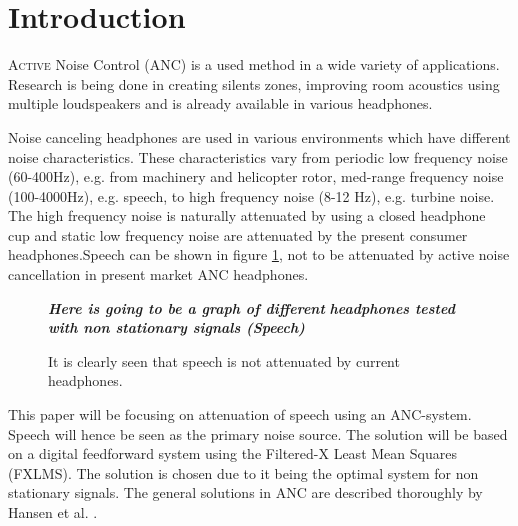 \section{Introduction}
\lettrine[lines=2]{A}{ctive} Noise Control (ANC) is a used method in a wide variety of applications. Research is being done in creating silents zones\cite{SilentZones}, improving room acoustics using multiple loudspeakers\cite{CAPS} and is already available in various headphones.

Noise canceling headphones are used in various environments which have different noise characteristics. These characteristics vary from periodic low frequency noise (60-400Hz), e.g. from machinery and helicopter rotor\cite{LowFrequency}, med-range frequency noise (100-4000Hz), e.g. speech\cite{MidFrequency}, to high frequency noise (8-12 Hz), e.g. turbine noise\cite{LowFrequency}. The high frequency noise is naturally attenuated by using a closed headphone cup\cite{naturalAttenuation} and static low frequency noise are attenuated by the present consumer headphones\cite{ConsumerANC}.Speech can be shown in figure \ref{fig:ANCcompare}, not to be attenuated by active noise cancellation in present market ANC headphones.

\begin{figure}[H]
	\centering
	\textbf{\textit{Here is going to be a graph of different}}
	\textbf{\textit{ headphones tested with non stationary signals (Speech)}}
	\caption{It is clearly seen that speech is not attenuated by current headphones.}
	\label{fig:ANCcompare}
\end{figure}


This paper will be focusing on attenuation of speech using an ANC-system. Speech will hence be seen as the primary noise source. The solution will be based on a digital feedforward system using the Filtered-X Least Mean Squares (FXLMS). The solution is chosen due to it being the optimal system for non stationary signals\cite{Hansen2}. The general solutions in ANC are described thoroughly by Hansen et al. \cite{Hansen}.

